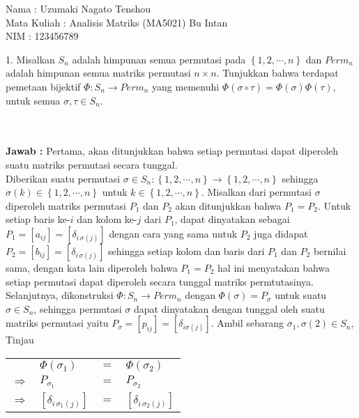 \documentclass[11pt,a4paper]{article}
\theoremstyle{plain}
\theoremstyle{definition}
\theoremstyle{remark}
\begin{document}
\begin{enumerate}
Nama : Uzumaki Nagato Tenshou\\
Mata Kuliah : Analisis Matriks (MA5021) Bu Intan\\
NIM : 123456789\\

\begin{enumerate}
	\- \\ \- \\
	\textbf{Jawab :} Pertama, akan ditunjukkan bahwa setiap permutasi dapat diperoleh suatu matriks permutasi secara tunggal.\\
	Diberikan suatu permutasi $\sigma\in S_{n}: \left\{ 1,2,\cdots,n\right\}\rightarrow \left\{ 1,2,\cdots,n\right\}$ sehingga $\sigma(k)\in \left\{ 1,2,\cdots,n\right\}$ untuk $k\in \left\{ 1,2,\cdots,n\right\}$. Misalkan dari permutasi $\sigma$ diperoleh matriks permutasi $P_{1}$ dan $P_{2}$ akan ditunjukkan bahwa $P_{1}=P_{2}$. Untuk setiap baris ke-$i$ dan kolom ke-$j$ dari $P_{1}$, dapat dinyatakan sebagai $P_{1}=[a_{ij}]=[\delta_{i\,\sigma(j)}]$ dengan cara yang sama untuk $P_{2}$ juga didapat $P_{2}=[b_{ij}]=[\delta_{i\,\sigma(j)}]$ sehingga setiap kolom dan baris dari $P_{1}$ dan $P_{2}$ bernilai sama, dengan kata lain diperoleh bahwa $P_{1}=P_{2}$ hal ini menyatakan bahwa setiap permutasi dapat diperoleh secara tunggal matriks permtutasinya.\\
	Selanjutnya, dikonstruksi $\Phi: S_{n}\rightarrow Perm_{n}$ dengan $\Phi(\sigma)=P_{\sigma}$ untuk suatu $\sigma \in S_{n}$, sehingga permutasi $\sigma$ dapat dinyatakan dengan tunggal oleh suatu matriks permutasi yaitu $P_{\sigma}=[p_{ij}]=[\delta_{i\sigma(j)}]$. Ambil sebarang $\sigma_{1},\sigma(2)\in S_{n}$, Tinjau
	\begin{center}
		\begin{tabular}{llll}
		& $\Phi(\sigma_{1})$           & $=$ & $\Phi(\sigma_{2})$           \\
		$\Rightarrow$ & $P_{\sigma_{1}}$             & $=$ & $P_{\sigma_{2}}$             \\
		$\Rightarrow$ & $[\delta_{i\, \sigma_{1}(j)}]$ & $=$ & $[\delta_{i\, \sigma_{2}(j)}]$

\end{tabular}
\end{center}
\end{enumerate}
\end{enumerate}
\end{document}
